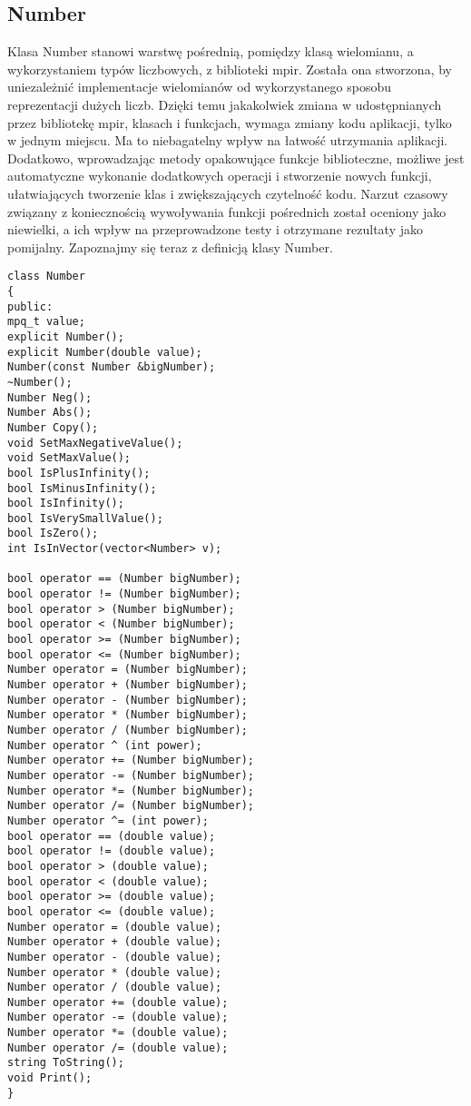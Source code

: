 \subsection{Number}
Klasa Number stanowi warstwę pośrednią, pomiędzy klasą wielomianu, a wykorzystaniem typów liczbowych, z biblioteki mpir. Została ona stworzona, by uniezależnić implementacje wielomianów od wykorzystanego sposobu reprezentacji dużych liczb. Dzięki temu jakakolwiek zmiana w udostępnianych przez bibliotekę mpir, klasach i funkcjach, wymaga zmiany kodu aplikacji, tylko w jednym miejscu. Ma to niebagatelny wpływ na łatwość utrzymania aplikacji. Dodatkowo, wprowadzając metody opakowujące funkcje biblioteczne, możliwe jest automatyczne wykonanie dodatkowych operacji i stworzenie nowych funkcji, ułatwiających tworzenie klas i zwiększających czytelność kodu. Narzut czasowy związany z koniecznością wywoływania funkcji pośrednich został oceniony jako niewielki, a ich wpływ na przeprowadzone testy i otrzymane rezultaty jako pomijalny. Zapoznajmy się teraz z definicją klasy Number.

\begin{lstlisting}
class Number
{
public:
mpq_t value;
explicit Number();
explicit Number(double value);
Number(const Number &bigNumber);
~Number();
Number Neg();
Number Abs();
Number Copy();
void SetMaxNegativeValue();
void SetMaxValue();
bool IsPlusInfinity();
bool IsMinusInfinity();
bool IsInfinity();
bool IsVerySmallValue();
bool IsZero();
int IsInVector(vector<Number> v);

bool operator == (Number bigNumber);
bool operator != (Number bigNumber);
bool operator > (Number bigNumber);
bool operator < (Number bigNumber);
bool operator >= (Number bigNumber);
bool operator <= (Number bigNumber);
Number operator = (Number bigNumber);
Number operator + (Number bigNumber);
Number operator - (Number bigNumber);
Number operator * (Number bigNumber);
Number operator / (Number bigNumber);
Number operator ^ (int power);
Number operator += (Number bigNumber);
Number operator -= (Number bigNumber);
Number operator *= (Number bigNumber);
Number operator /= (Number bigNumber);
Number operator ^= (int power);
bool operator == (double value);
bool operator != (double value);
bool operator > (double value);
bool operator < (double value);
bool operator >= (double value);
bool operator <= (double value);
Number operator = (double value);
Number operator + (double value);
Number operator - (double value);
Number operator * (double value);
Number operator / (double value);
Number operator += (double value);
Number operator -= (double value);
Number operator *= (double value);
Number operator /= (double value);
string ToString();
void Print();
}
\end{lstlisting}

